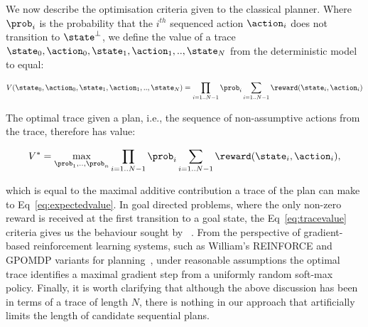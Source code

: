 








We now describe the optimisation criteria given to the classical
planner. Where $\prob_i$ is the probability that the $i^{th}$
sequenced action $\action_i$ does not transition to $\state^\bot$, we
define the value of a trace
$\state_0, \action_0, \state_1, \action_1,.., \state_N$ from the
deterministic model to equal:

\begin{equation}\label{eq:tracevalue}
V(\state_0, \action_0, \state_1, \action_1,.., \state_N) =  \prod_{i=1..N-1} \prob_i \sum_{i=1..N-1} \reward(\state_i, \action_i)
\end{equation}

\noindent The optimal trace given a plan, i.e., the sequence of non-assumptive
actions from the trace, therefore has value:

\[
V^* = \max_{\prob_1, .., \prob_n} \prod_{i=1..N-1} \prob_i \sum_{i=1..N-1}
\reward(\state_i, \action_i),
\]

\noindent which is equal to the maximal 
additive contribution a trace of the plan can make to
Eq~\ref{eq:expectedvalue}.  In goal directed problems, where the only
non-zero reward is received at the first transition to a goal state,
the Eq~\ref{eq:tracevalue} criteria gives us the behaviour sought
by ~\cite{yoon:etal:2007}. From the perspective of
gradient-based reinforcement learning systems, such as William's
REINFORCE and GPOMDP variants for planning~\cite{olivier:doug:2009},
under reasonable assumptions the optimal trace identifies a maximal
gradient step from a uniformly random soft-max policy. Finally, it is
worth clarifying that although the above discussion has been in terms
of a trace of length $N$, there is nothing in our approach that
artificially limits the length of candidate sequential plans.


